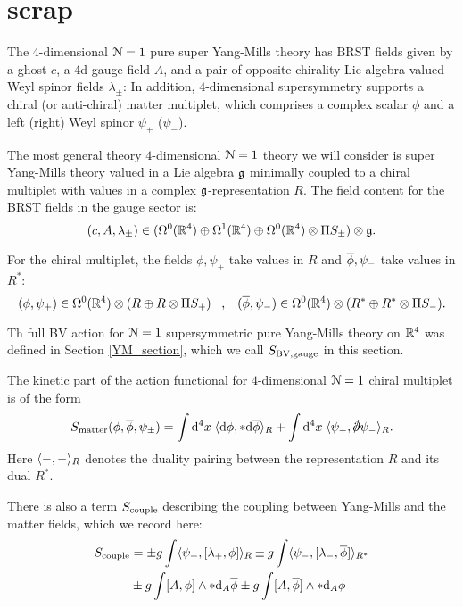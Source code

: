 \documentclass[10pt, oneside]{article}
\begin{document}
\section{scrap}

The 4-dimensional $\mc N=1$ pure super Yang-Mills theory has BRST fields given by a ghost $c$, a 4d gauge field $A$, and a pair of opposite chirality Lie algebra valued Weyl spinor fields $\lambda_\pm$:
In addition, $4$-dimensional supersymmetry supports a chiral (or anti-chiral) matter multiplet, which comprises a complex scalar $\phi$ and a left (right) Weyl spinor $\psi_+$ ($\psi_-$).

The most general theory $4$-dimensional $\mc N = 1$ theory we will consider is super Yang-Mills theory valued in a Lie algebra $\fg$ minimally coupled to a chiral multiplet with values in a complex $\fg$-representation $R$. 
The field content for the BRST fields in the gauge sector is:
\[
(c, A, \lambda_\pm) \in (\Omega^0(\RR^4) \oplus \Omega^1(\RR^4) \oplus \Omega^0(\RR^4) \otimes \Pi S_\pm) \otimes \fg .
\]

For the chiral multiplet, the fields $\phi, \psi_+$ take values in $R$ and $\Bar{\phi}, \psi_-$ take values in $R^*$:
\[
(\phi, \psi_+) \in \Omega^0(\RR^4) \otimes (R \oplus R \otimes \Pi S_+) \;\;\; , \;\;\; (\Bar{\phi}, \psi_-) \in \Omega^0(\RR^4) \otimes (R^* \oplus R^* \otimes \Pi S_-) .
\]

Th full BV action for $\cN=1$ supersymmetric pure Yang-Mills theory on $\RR^4$ was defined in Section \ref{YM_section}, which we call $S_{\rm BV, gauge}$ in this section.

The kinetic part of the action functional for $4$-dimensional $\mc N = 1$ chiral multiplet is of the form
\[
S_{\rm matter} (\phi, \Bar{\phi}, \psi_{\pm}) = \int \d^4 x \; \<\d \phi , * \d \Bar{\phi}\>_R + \int \d^4 x \; \<\psi_+ , \sd \dd \psi_-\>_R .
\]
Here $\<-,-\>_R$ denotes the duality pairing between the representation $R$ and its dual $R^*$. 

There is also a term $S_{\rm couple}$ describing the coupling between Yang-Mills and the matter fields, which we record here:
\begin{align*}
S_{\rm couple} & = \pm g \int \<\psi_+, [\lambda_+, \phi]\>_R \pm g \int \<\psi_-, [\lambda_-, \Bar{\phi}]\>_{R^*} \\
& \pm g \int [A, \phi] \wedge * \d_{A} \Bar{\phi} \pm g \int [A, \Bar{\phi}] \wedge * \d_A \phi
\end{align*}
\end{document}

